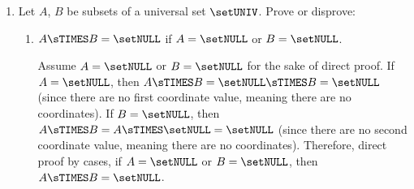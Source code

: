 \begin{enumerate}
\begin{enumerate}
    \item If \(A \sOR B = A \sOR C\), then \(B = C\).
    \begin{subdisprove}
      Let $\setUNIV = \{1, 2, 3, 4\}$, $A = \{1, 2\}$, $B = \{2, 3\}$, and $C = \{3\}$ 
      be subsets of a universal set $\setUNIV$
      for the sake of counterexample.
      Then $A \sOR B = \{1, 2, 3\}$ and $A \sOR C = \{1, 2, 3\}$, so $A \sOR B = A \sOR C$.
      However, $B = \{2, 3\} \neq \{3\} = C$.
      Therefore, it is \textbf{false} that \(A \sOR B = A \sOR C\) only if \(B = C\).
    \end{subdisprove}
    
    \item If \(A \sAND B = A \sAND C\) and \(A \sOR B = A \sOR C\), then \(B = C\).
    \begin{subprove}
      Assume $A \sAND B = A \sAND C$ and $A \sOR B = A \sOR C$ for 
      the sake of direct proof.
      By definition of set equality, both directions of subset relations are 
      required as follows.\vspace*{10px}\\
      ($\subseteq$) Let $x \in B$ be arbitrary.
      Since $x \in B$, it follows that $x \in A \sOR B = A \sOR C$.
      Therefore, $x \in A$ or $x \in C$ (trivial). If $x \in A$, then 
      $x \in A \sAND B = A \sAND C$, so $x \in C$.
      Hence, $B \subseteq C$.\vspace*{10px}\\
      ($\supseteq$) Let $x \in C$ be arbitrary.
      Since $x \in C$, it follows that $x \in A \sOR C = A \sOR B$.
      Therefore, $x \in A$ or $x \in B$ (trivial).
      If $x \in A$, then $x \in A \sAND C = A \sAND B$, so $x \in B$.
      Hence, $C \subseteq B$.\vspace*{10px}\\
      Therefore, by ($\subseteq$) and ($\supseteq$), \(B = C\) when \(A \sAND B = A \sAND C\) and \(A \sOR B = A \sOR C\).
    \end{subprove}
  \end{enumerate}

  \newpage


  \item Let $A$, $B$ be subsets of a universal set $\setUNIV$.
  Prove or disprove:
  \begin{enumerate}
    \item $A \sTIMES B = \setNULL$ if $A = \setNULL$ or $B = \setNULL$.
    \begin{subprove}
      Assume $A = \setNULL$ or $B = \setNULL$ for the sake of direct proof.
      If $A = \setNULL$, then $A \sTIMES B = \setNULL \sTIMES B = \setNULL$ (since there are no first coordinate value, meaning there are no coordinates).
      If $B = \setNULL$, then $A \sTIMES B = A \sTIMES \setNULL = \setNULL$ (since there are no second coordinate value, meaning there are no coordinates).
      Therefore, direct proof by cases, if $A = \setNULL$ or $B = \setNULL$, then $A \sTIMES B = \setNULL$.
    \end{subprove}
    

\end{enumerate}
\end{enumerate}
